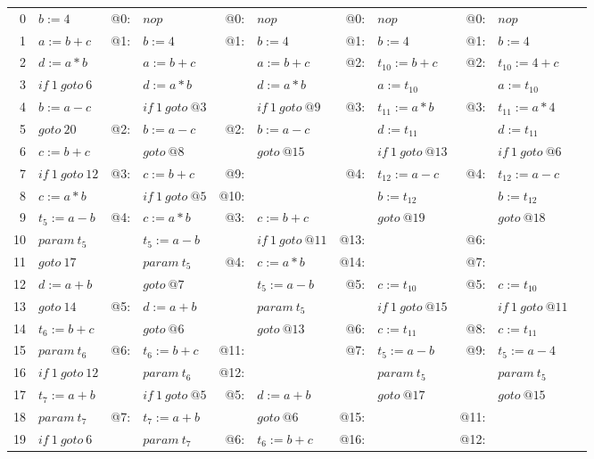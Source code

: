 \documentclass[landscape]{article}
\begin{document}
\begin{tabular}{rlrlrlrlrll}
0 & $b:=4$ & @0: & $nop$ & @0: & $nop$ & @0: & $nop$ & @0: & $nop$ & \\
1 & $a:=b+c$ & @1: & $b:=4$ & @1: & $b:=4$ & @1: & $b:=4$ & @1: & $b:=4$ & \\
2 & $d:=a*b$ &  & $a:=b+c$ &  & $a:=b+c$ & @2: & $t_{10}:=b+c$ & @2: & $t_{10}:=4+c$ & \\
3 & $if\:1\:goto\:6$ &  & $d:=a*b$ &  & $d:=a*b$ &  & $a:=t_{10}$ &  & $a:=t_{10}$ & \\
4 & $b:=a-c$ &  & $if\:1\:goto\:@3$ &  & $if\:1\:goto\:@9$ & @3: & $t_{11}:=a*b$ & @3: & $t_{11}:=a*4$ & \\
5 & $goto\:20$ & @2: & $b:=a-c$ & @2: & $b:=a-c$ &  & $d:=t_{11}$ &  & $d:=t_{11}$ & \\
6 & $c:=b+c$ &  & $goto\:@8$ &  & $goto\:@15$ &  & $if\:1\:goto\:@13$ &  & $if\:1\:goto\:@6$ & \\
7 & $if\:1\:goto\:12$ & @3: & $c:=b+c$ & @9: & & @4: & $t_{12}:=a-c$ & @4: & $t_{12}:=a-c$ & \\
8 & $c:=a*b$ &  & $if\:1\:goto\:@5$ & @10: & &  & $b:=t_{12}$ &  & $b:=t_{12}$ & \\
9 & $t_{5}:=a-b$ & @4: & $c:=a*b$ & @3: & $c:=b+c$ &  & $goto\:@19$ &  & $goto\:@18$ & \\
10 & $param\:t_{5}$ &  & $t_{5}:=a-b$ &  & $if\:1\:goto\:@11$ & @13: & & @6: & & \\
11 & $goto\:17$ &  & $param\:t_{5}$ & @4: & $c:=a*b$ & @14: & & @7: & & \\
12 & $d:=a+b$ &  & $goto\:@7$ &  & $t_{5}:=a-b$ & @5: & $c:=t_{10}$ & @5: & $c:=t_{10}$ & \\
13 & $goto\:14$ & @5: & $d:=a+b$ &  & $param\:t_{5}$ &  & $if\:1\:goto\:@15$ &  & $if\:1\:goto\:@11$ & \\
14 & $t_{6}:=b+c$ &  & $goto\:@6$ &  & $goto\:@13$ & @6: & $c:=t_{11}$ & @8: & $c:=t_{11}$ & \\
15 & $param\:t_{6}$ & @6: & $t_{6}:=b+c$ & @11: & & @7: & $t_{5}:=a-b$ & @9: & $t_{5}:=a-4$ & \\
16 & $if\:1\:goto\:12$ &  & $param\:t_{6}$ & @12: & &  & $param\:t_{5}$ &  & $param\:t_{5}$ & \\
17 & $t_{7}:=a+b$ &  & $if\:1\:goto\:@5$ & @5: & $d:=a+b$ &  & $goto\:@17$ &  & $goto\:@15$ & \\
18 & $param\:t_{7}$ & @7: & $t_{7}:=a+b$ &  & $goto\:@6$ & @15: & & @11: & & \\
19 & $if\:1\:goto\:6$ &  & $param\:t_{7}$ & @6: & $t_{6}:=b+c$ & @16: & & @12: & & \\

\end{tabular}
\end{document}
